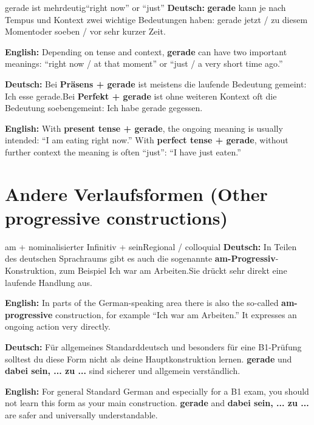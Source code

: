 \documentclass[a4paper,11pt]{article}
\newcommand{\GermanText}[1]{\textbf{Deutsch: }#1\par}
\newcommand{\EnglishText}[1]{{\small\color{SoftGray}\textbf{English: }#1\par}}
\begin{document}
        \begin{grammarentry}{gerade ist mehrdeutig}{``right now'' or ``just''}
            \GermanText{\textbf{gerade} kann je nach Tempus und Kontext zwei wichtige Bedeutungen haben: \glqq gerade jetzt / zu diesem Moment\grqq oder \glqq soeben / vor sehr kurzer Zeit\grqq.}
            \EnglishText{Depending on tense and context, \textbf{gerade} can have two important meanings: ``right now / at that moment'' or ``just / a very short time ago.''}

            \GermanText{Bei \textbf{Präsens + gerade} ist meistens die laufende Bedeutung gemeint: \glqq Ich esse gerade.\grqq Bei \textbf{Perfekt + gerade} ist ohne weiteren Kontext oft die Bedeutung \glqq soeben\grqq gemeint: \glqq Ich habe gerade gegessen.\grqq}
            \EnglishText{With \textbf{present tense + gerade}, the ongoing meaning is usually intended: ``I am eating right now.'' With \textbf{perfect tense + gerade}, without further context the meaning is often ``just'': ``I have just eaten.''}
        \end{grammarentry}

\section{Andere Verlaufsformen \textnormal{(Other progressive constructions)}}

        \begin{grammarentry}{am + nominalisierter Infinitiv + sein}{Regional / colloquial}
            \GermanText{In Teilen des deutschen Sprachraums gibt es auch die sogenannte \textbf{am-Progressiv}-Konstruktion, zum Beispiel \glqq Ich war am Arbeiten.\grqq Sie drückt sehr direkt eine laufende Handlung aus.}
            \EnglishText{In parts of the German-speaking area there is also the so-called \textbf{am-progressive} construction, for example ``Ich war am Arbeiten.'' It expresses an ongoing action very directly.}

            \GermanText{Für allgemeines Standarddeutsch und besonders für eine B1-Prüfung solltest du diese Form nicht als deine Hauptkonstruktion lernen. \textbf{gerade} und \textbf{dabei sein, ... zu ...} sind sicherer und allgemein verständlich.}
            \EnglishText{For general Standard German and especially for a B1 exam, you should not learn this form as your main construction. \textbf{gerade} and \textbf{dabei sein, ... zu ...} are safer and universally understandable.}
        \end{grammarentry}
\end{document}
